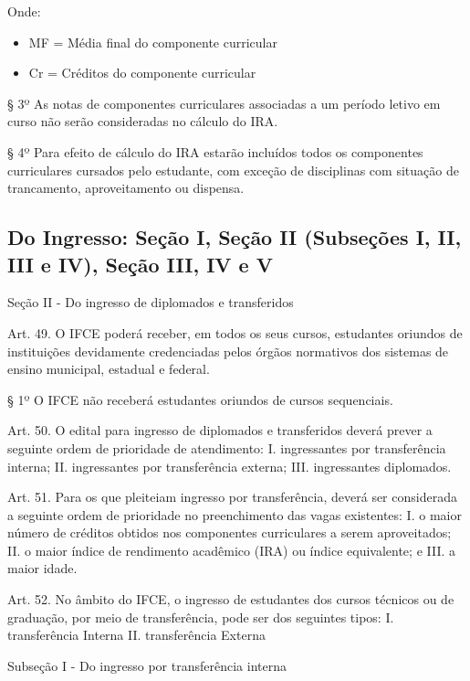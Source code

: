 {Onde:

\begin{itemize}
	\item MF = Média final do componente curricular
	\item Cr = Créditos do componente curricular
\end{itemize}

§ 3º As notas de componentes curriculares associadas a um período letivo em curso não serão consideradas no cálculo do IRA.

§ 4º Para efeito de cálculo do IRA estarão incluídos todos os componentes curriculares cursados pelo estudante, com exceção de disciplinas com situação de trancamento, aproveitamento ou dispensa.

\subsection*{\footnotesize  Do Ingresso: Seção I, Seção II (Subseções I, II, III e IV), Seção III, IV e V}
\label{anexoRODtransferencia}

\begin{center}
	Seção II - Do ingresso de diplomados e transferidos
\end{center}

Art. 49. O IFCE poderá receber, em todos os seus cursos, estudantes oriundos de instituições devidamente credenciadas pelos órgãos normativos dos sistemas de ensino municipal, estadual e federal.

§ 1º O IFCE não receberá estudantes oriundos de cursos sequenciais.

Art. 50. O edital para ingresso de diplomados e transferidos deverá prever a seguinte ordem de prioridade de atendimento:
I. ingressantes por transferência interna;
II. ingressantes por transferência externa;
III. ingressantes diplomados.

Art. 51. Para os que pleiteiam ingresso por transferência, deverá ser considerada a seguinte ordem de prioridade no preenchimento das vagas existentes:
I. o maior número de créditos obtidos nos componentes curriculares a serem aproveitados;
II. o maior índice de rendimento acadêmico (IRA) ou índice equivalente; e
III. a maior idade.

Art. 52. No âmbito do IFCE, o ingresso de estudantes dos cursos técnicos ou de graduação, por meio de transferência, pode ser dos seguintes tipos:
I. transferência Interna
II. transferência Externa

\begin{center}
	Subseção I - Do ingresso por transferência interna
\end{center}

}
